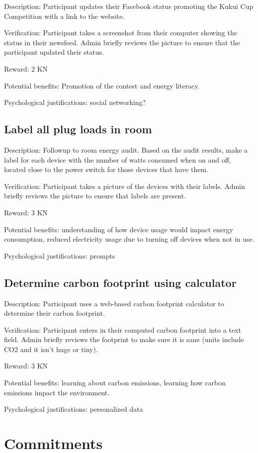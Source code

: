 Description: Participant updates their Facebook status promoting the Kukui Cup Competition with a link to the website.

Verification: Participant takes a screenshot from their computer showing the status in their newsfeed. Admin briefly reviews the picture to ensure that the participant updated their status.

Reward: 2 KN

Potential benefits: Promotion of the contest and energy literacy.

Psychological justifications: social networking?

\subsection{Label all plug loads in room}

Description: Followup to room energy audit. Based on the audit results, make a label for each device with the number of watts consumed when on and off, located close to the power switch for those devices that have them.

Verification: Participant takes a picture of the devices with their labels. Admin briefly reviews the picture to ensure that labels are present.

Reward: 3 KN

Potential benefits: understanding of how device usage would impact energy consumption, reduced electricity usage due to turning off devices when not in use.

Psychological justifications: prompts

\subsection{Determine carbon footprint using calculator}

Description: Participant uses a web-based carbon footprint calculator to determine their carbon footprint.

Verification: Participant enters in their computed carbon footprint into a text field. Admin briefly reviews the footprint to make sure it is sane (units include CO2 and it isn't huge or tiny).

Reward: 3 KN

Potential benefits: learning about carbon emissions, learning how carbon emissions impact the environment.

Psychological justifications: personalized data


\section{Commitments}

